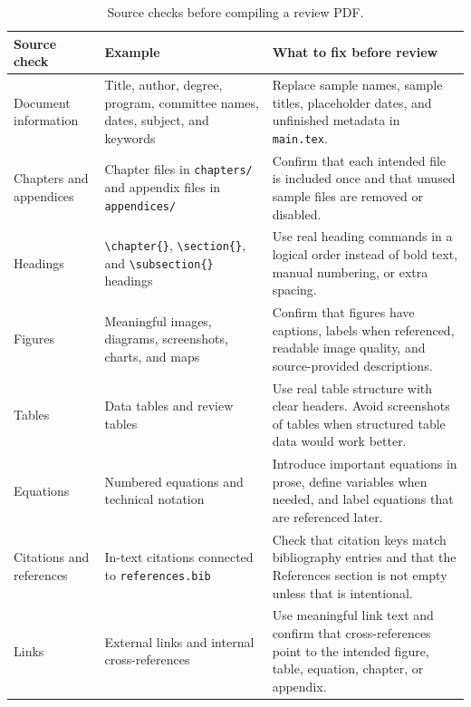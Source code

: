 \begin{table}[htb]
\caption{Source checks before compiling a review PDF.}
\label{tab:source-review-checks}

\begin{ndsudatatable}[headers={1}]
\begin{tabularx}{\textwidth}{L{1.55in}XX}
\toprule
\textbf{Source check} & \textbf{Example} & \textbf{What to fix before review} \\
\midrule
Document information & Title, author, degree, program, committee names, dates, subject, and keywords & Replace sample names, sample titles, placeholder dates, and unfinished metadata in \texttt{main.tex}. \\

Chapters and appendices & Chapter files in \texttt{chapters/} and appendix files in \texttt{appendices/} & Confirm that each intended file is included once and that unused sample files are removed or disabled. \\

Headings & \texttt{\textbackslash chapter\{\}}, \texttt{\textbackslash section\{\}}, and \texttt{\textbackslash subsection\{\}} headings & Use real heading commands in a logical order instead of bold text, manual numbering, or extra spacing. \\

Figures & Meaningful images, diagrams, screenshots, charts, and maps & Confirm that figures have captions, labels when referenced, readable image quality, and source-provided descriptions. \\

Tables & Data tables and review tables & Use real table structure with clear headers. Avoid screenshots of tables when structured table data would work better. \\

Equations & Numbered equations and technical notation & Introduce important equations in prose, define variables when needed, and label equations that are referenced later. \\

Citations and references & In-text citations connected to \texttt{references.bib} & Check that citation keys match bibliography entries and that the References section is not empty unless that is intentional. \\

Links & External links and internal cross-references & Use meaningful link text and confirm that cross-references point to the intended figure, table, equation, chapter, or appendix. \\


\end{tabularx}
\end{ndsudatatable}
\end{table}
